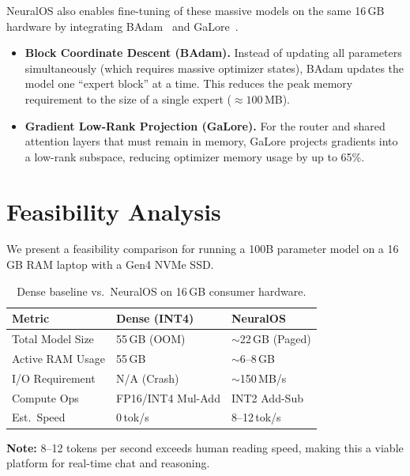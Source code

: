 \documentclass[11pt,twocolumn]{article}
\begin{document}
NeuralOS also enables fine-tuning of these massive models on the same 16\,GB hardware by integrating BAdam~\cite{luo2024badam} and GaLore~\cite{zhao2024galore}.

\begin{itemize}
    \item \textbf{Block Coordinate Descent (BAdam).} Instead of updating all parameters simultaneously (which requires massive optimizer states), BAdam updates the model one ``expert block'' at a time. This reduces the peak memory requirement to the size of a single expert (${\approx}100$\,MB).

    \item \textbf{Gradient Low-Rank Projection (GaLore).} For the router and shared attention layers that must remain in memory, GaLore projects gradients into a low-rank subspace, reducing optimizer memory usage by up to 65\%.
\end{itemize}

\section{Feasibility Analysis}

We present a feasibility comparison for running a 100B parameter model on a 16\,GB RAM laptop with a Gen4 NVMe SSD.

\begin{table}[h]
\centering
\caption{Dense baseline vs.\ NeuralOS on 16\,GB consumer hardware.}
\label{tab:feasibility}
\begin{tabular}{@{}lll@{}}
\toprule
\textbf{Metric} & \textbf{Dense (INT4)} & \textbf{NeuralOS} \\
\midrule
Total Model Size  & 55\,GB (OOM)       & ${\sim}$22\,GB (Paged) \\
Active RAM Usage  & 55\,GB             & ${\sim}$6--8\,GB       \\
I/O Requirement   & N/A (Crash)        & ${\sim}$150\,MB/s      \\
Compute Ops       & FP16/INT4 Mul-Add  & INT2 Add-Sub           \\
Est.\ Speed       & 0\,tok/s           & 8--12\,tok/s           \\
\bottomrule
\end{tabular}
\end{table}

\noindent\textbf{Note:} 8--12 tokens per second exceeds human reading speed, making this a viable platform for real-time chat and reasoning.
\end{document}
